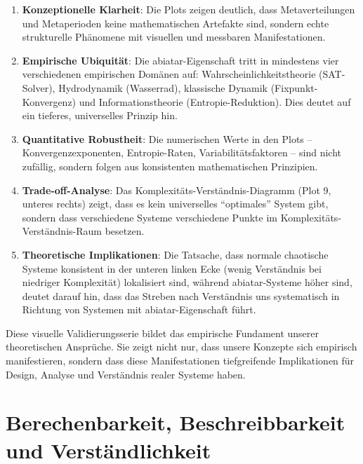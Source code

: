 \documentclass[a4paper,12pt]{article}
\theoremstyle{definition}
\begin{document}
\begin{enumerate}
	\item \textbf{Konzeptionelle Klarheit}: Die Plots zeigen deutlich, dass Metaverteilungen und Metaperioden keine mathematischen Artefakte sind, sondern echte strukturelle Phänomene mit visuellen und messbaren Manifestationen.
	
	\item \textbf{Empirische Ubiquität}: Die abiatar-Eigenschaft tritt in mindestens vier verschiedenen empirischen Domänen auf: Wahrscheinlichkeitstheorie (SAT-Solver), Hydrodynamik (Wasserrad), klassische Dynamik (Fixpunkt-Konvergenz) und Informationstheorie (Entropie-Reduktion). Dies deutet auf ein tieferes, universelles Prinzip hin.
	
	\item \textbf{Quantitative Robustheit}: Die numerischen Werte in den Plots -- Konvergenzexponenten, Entropie-Raten, Variabilitätsfaktoren -- sind nicht zufällig, sondern folgen aus konsistenten mathematischen Prinzipien.
	
	\item \textbf{Trade-off-Analyse}: Das Komplexitäts-Verständnis-Diagramm (Plot 9, unteres rechts) zeigt, dass es kein universelles ``optimales'' System gibt, sondern dass verschiedene Systeme verschiedene Punkte im Komplexitäts-Verständnis-Raum besetzen.
	
	\item \textbf{Theoretische Implikationen}: Die Tatsache, dass normale chaotische Systeme konsistent in der unteren linken Ecke (wenig Verständnis bei niedriger Komplexität) lokalisiert sind, während abiatar-Systeme höher sind, deutet darauf hin, dass das Streben nach Verständnis uns systematisch in Richtung von Systemen mit abiatar-Eigenschaft führt.
\end{enumerate}

Diese visuelle Validierungsserie bildet das empirische Fundament unserer theoretischen Ansprüche. Sie zeigt nicht nur, dass unsere Konzepte sich empirisch manifestieren, sondern dass diese Manifestationen tiefgreifende Implikationen für Design, Analyse und Verständnis realer Systeme haben.


\section{Berechenbarkeit, Beschreibbarkeit und Verständlichkeit}
\end{document}
